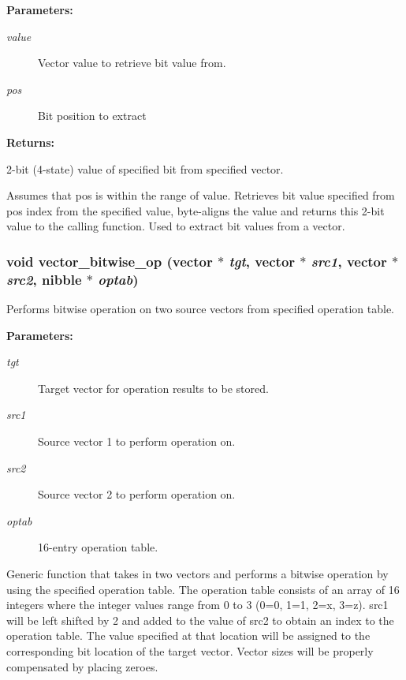 \begin{Desc}
\item[{\bf Parameters: }]\par
\begin{description}
\item[
{\em value}]Vector value to retrieve bit value from. \item[
{\em pos}]Bit position to extract \end{description}
\end{Desc}
\begin{Desc}
\item[{\bf Returns: }]\par
2-bit (4-state) value of specified bit from specified vector.

\end{Desc}
Assumes that pos is within the range of value. Retrieves bit value specified from pos index from the specified value, byte-aligns the value and returns this 2-bit value to the calling function. Used to extract bit values from a vector. 
\subsubsection{\setlength{\rightskip}{0pt plus 5cm}void vector\_\-bitwise\_\-op ({\bf vector} $\ast$ {\em tgt}, {\bf vector} $\ast$ {\em src1}, {\bf vector} $\ast$ {\em src2}, {\bf nibble} $\ast$ {\em optab})}\label{vector_8h_a22}


Performs bitwise operation on two source vectors from specified operation table.

\begin{Desc}
\item[{\bf Parameters: }]\par
\begin{description}
\item[
{\em tgt}]Target vector for operation results to be stored. \item[
{\em src1}]Source vector 1 to perform operation on. \item[
{\em src2}]Source vector 2 to perform operation on. \item[
{\em optab}]16-entry operation table.

\end{description}
\end{Desc}
Generic function that takes in two vectors and performs a bitwise operation by using the specified operation table. The operation table consists of an array of 16 integers where the integer values range from 0 to 3 (0=0, 1=1, 2=x, 3=z). src1 will be left shifted by 2 and added to the value of src2 to obtain an index to the operation table. The value specified at that location will be assigned to the corresponding bit location of the target vector. Vector sizes will be properly compensated by placing zeroes. 
